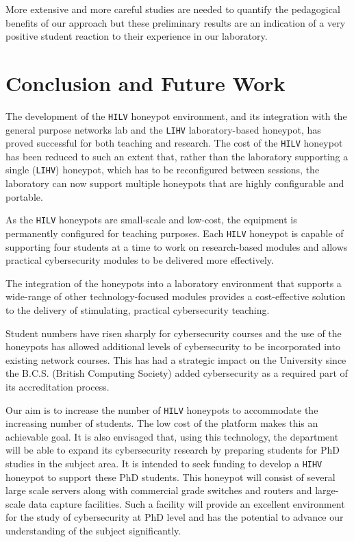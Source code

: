 \documentclass{ieeeaccess}
\begin{document}
More extensive and more careful studies are needed to quantify the 
pedagogical benefits of our approach but these preliminary results are an 
indication of a very positive student reaction to their experience in our
laboratory.

\section{Conclusion and Future Work}\label{sec:ConclusionFuture}

The development of the \texttt{HILV} honeypot environment, and its integration
with the general purpose networks lab and the \texttt{LIHV} laboratory-based
honeypot, has proved successful for both teaching and research. The cost of the
\texttt{HILV} honeypot has been reduced to such an extent that, rather than the
laboratory supporting a single (\texttt{LIHV}) honeypot, which has to be
reconfigured between sessions, the laboratory can now support multiple
honeypots that are highly configurable and portable.

As the \texttt{HILV} honeypots are small-scale and low-cost, the equipment is
permanently configured for teaching purposes. Each \texttt{HILV} honeypot is
capable of supporting four students at a time to work on research-based modules
and allows practical cybersecurity modules to be delivered more effectively.

The integration of the honeypots into a laboratory environment that supports
a wide-range of other technology-focused modules provides a cost-effective
solution to the delivery of stimulating, practical cybersecurity teaching.

Student numbers have risen sharply for cybersecurity courses and the
use of the honeypots has allowed additional levels of cybersecurity to be
incorporated into existing network courses. This has had a strategic impact on
the University since the B.C.S. (British Computing Society) added
cybersecurity as a required part of its accreditation process.

Our aim is to increase the number of \texttt{HILV} honeypots to accommodate the
increasing number of students. The low cost of the platform makes this an
achievable goal. It is also envisaged that, using this technology, the
department will be able to expand its cybersecurity research by preparing
students for PhD studies in the subject area. It is intended to seek funding to
develop a \texttt{HIHV} honeypot to support these PhD students. This honeypot
will consist of several large scale servers along with commercial grade
switches and routers and large-scale data capture facilities. Such a facility
will provide an excellent environment for the study of cybersecurity at PhD
level and has the potential to advance our understanding of the subject
significantly.
\end{document}
